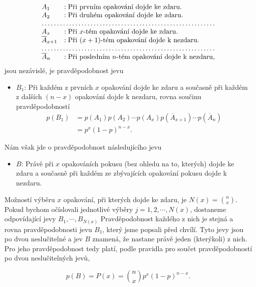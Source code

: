       \begin{gather*}
        \begin{array}{ll}
          A_1                &: \text{Při prvním opakování dojde ke zdaru.}                  \\
          A_2                &: \text{Při druhém opakování dojde ke zdaru.}                  \\
          \hdotsfor{2}                                                                       \\
          A_x                &: \text{Při \(x\)-tém opakování dojde ke zdaru.}               \\
          \overline{A}_{x+1} &: \text{Při \((x + 1)\)-tém opakování dojde k nezdaru.}        \\
          \hdotsfor{2}                                                                       \\
          \overline{A}_n     &: \text{Při posledním \(n\)-tém opakování dojde k nezdaru,}
        \end{array}
      \end{gather*}
      jsou nezávislé, je pravděpodobnost jevu
      \begin{itemize}
        \item \(B_1\): Při každém z prvních \(x\) opakování dojde ke zdaru a současně při každém z
              dalších \((n - x)\) opakování dojde k nezdaru, rovna součinu pravděpodobností
              \begin{align*}
                p(B_1) &= p(A_1)p(A_2)\cdots p(A_x)p(\overline{A}_{x+1})\cdots p(\overline{A}_n) \\
                       &= p^x (1 - p)^{n-x}.
              \end{align*}
      \end{itemize}
      Nám však jde o pravděpodobnost následujícího jevu
      \begin{itemize}
        \item \(B\): Právě při \(x\) opakováních pokusu (bez ohledu na to, kterých) dojde ke zdaru a
              současně při každém ze zbývajících opakování pokusu dojde k nezdaru.
      \end{itemize}
      
      Možností výběru \(x\) opakování, při kterých dojde ke zdaru, je \(N(x) = \binom{n}{x}\). Pokud
      bychom očíslovali jednotlivé výběry \(j = 1, 2, \cdots, N(x)\), dostaneme odpovídající jevy
      \(B_1, \cdots, B_{N(x)}\) Pravděpodobnost každého z nich je stejná a rovna pravděpodobnosti
      jevu \(B_1\), který jsme popsali před chvílí. Tyto jevy jsou po dvou neslučitelné a jev \(B\)
      znamená, že nastane právě jeden (kterýkoli) z nich. Pro jeho pravděpodobnost tedy platí, podle
      pravidla pro součet pravděpodobností po dvou neslučitelných jevů, 
      \begin{mdframed}[style=highlight]
        \begin{equation}\label{mai:eq055}
          p(B) = P(x) = \binom{n}{x}p^x (1 - p)^{n-x}.
        \end{equation}
      \end{mdframed}
      
